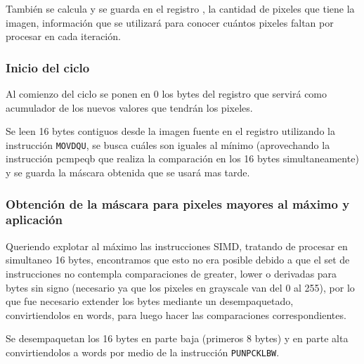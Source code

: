 También se calcula y se guarda en el registro \rcx, la cantidad de pixeles que tiene la imagen, información que se utilizará para conocer cuántos pixeles faltan por procesar en cada iteración.

\subsubsection{Inicio del ciclo}
Al comienzo del ciclo se ponen en 0 los bytes del registro  que servirá como acumulador de los nuevos valores que tendrán los pixeles.

Se leen 16 bytes contiguos desde la imagen fuente en el registro  utilizando la instrucción \texttt{MOVDQU}, se busca cuáles son iguales al mínimo (aprovechando la instrucción pcmpeqb que realiza la comparación en los 16 bytes simultaneamente) y se guarda la máscara obtenida que se usará mas tarde.

\subsubsection{Obtención de la máscara para pixeles mayores al máximo y aplicación}

Queriendo explotar al máximo las instrucciones SIMD, tratando de procesar en simultaneo 16 bytes, encontramos que esto no era posible debido a que el set de instrucciones no contempla comparaciones de greater, lower o derivadas para bytes sin signo (necesario ya que los pixeles en grayscale van del 0 al 255), por lo que fue necesario extender los bytes mediante un desempaquetado, convirtiendolos en words, para luego hacer las comparaciones correspondientes.

Se desempaquetan los 16 bytes en parte baja (primeros 8 bytes) y en parte alta convirtiendolos a words por medio de la instrucción \texttt{PUNPCKLBW}.

\begin{center}
\end{center}

